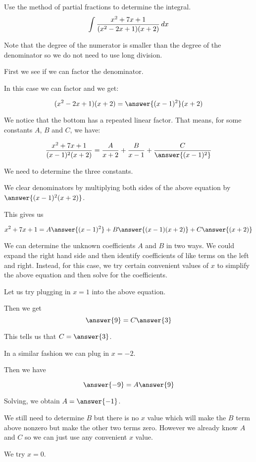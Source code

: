 \documentclass{ximera}
\author{Jason Miller}
\begin{document}
\begin{exercise}
Use the method of partial fractions to determine the integral.
\[
\int \frac{x^{2}+7x+1}{(x^{2}-2x+1)(x+2)} \mathop{}\!d x
\]

Note that the degree of the numerator is smaller than the degree of the denominator so we do not need 
to use long division. 

First we see if we can factor the denominator. 

In this case we can factor and we get:

\[
(x^{2}-2x+1)(x+2)=\answer{(x-1)^{2}}(x+2)
\]

\begin{exercise} 

We notice that the bottom has a repeated linear factor. That means, for some constants $A$, $B$ and $C$, we have:

\[
\frac{x^{2}+7x+1}{(x-1)^{2}(x+2)}= \frac{A}{x+2} + \frac{B}{x-1} +\frac{C}{\answer{(x-1)^{2}}}
\]

We need to determine the three constants. 

We clear denominators by multiplying both sides of the above equation by $\answer{(x-1)^{2}(x+2)}$. 

This gives us 

\[
x^{2}+7x+1=A\answer{ (x-1)^{2}} + B\answer{ (x-1)(x+2)} +  C\answer{ (x+2)}
\]

We can determine the unknown coefficients $A$ and $B$ in two ways. 
We could expand the right hand side and then identify coefficients of like terms on the left and right.
Instead, for this case, we try certain convenient values of $x$ to simplify the above equation and then solve for the coefficients. 

Let us try plugging in $x=1$ into the above equation. 

Then we get 
\[
\answer{9 }= C\answer{3}
\]

This tells us that $C=\answer{ 3}$. 


In a similar fashion we can plug in $x=-2$. 

Then we have 

\[
\answer{-9}=A\answer{9}
\]

Solving, we obtain $A=\answer{-1}$. 

We still need to determine $B$ but there is no $x$ value which will make the $B$ term above nonzero but make the other two terms zero. 
However we already know $A$ and $C$ so we can just use any convenient $x$ value.

We try $x=0$. 


\end{exercise}
\end{exercise}
\end{document}
